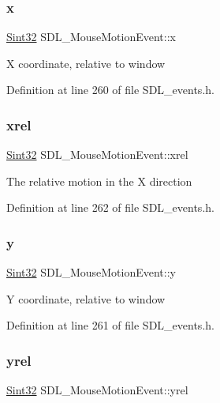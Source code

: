\subsubsection{\texorpdfstring{x}{x}}
{\footnotesize\ttfamily \mbox{\hyperlink{_s_d_l__stdinc_8h_a7a90b941db9d4582e9ad7abb9940ff7e}{Sint32}} S\+D\+L\+\_\+\+Mouse\+Motion\+Event\+::x}

X coordinate, relative to window 

Definition at line 260 of file S\+D\+L\+\_\+events.\+h.

\mbox{\label{struct_s_d_l___mouse_motion_event_a1c01d9aba2a20778fb45a15dca39ef58}} 
\subsubsection{\texorpdfstring{xrel}{xrel}}
{\footnotesize\ttfamily \mbox{\hyperlink{_s_d_l__stdinc_8h_a7a90b941db9d4582e9ad7abb9940ff7e}{Sint32}} S\+D\+L\+\_\+\+Mouse\+Motion\+Event\+::xrel}

The relative motion in the X direction 

Definition at line 262 of file S\+D\+L\+\_\+events.\+h.

\mbox{\label{struct_s_d_l___mouse_motion_event_a7e6a7b1f8713d1968dc913908e8ea448}} 
\subsubsection{\texorpdfstring{y}{y}}
{\footnotesize\ttfamily \mbox{\hyperlink{_s_d_l__stdinc_8h_a7a90b941db9d4582e9ad7abb9940ff7e}{Sint32}} S\+D\+L\+\_\+\+Mouse\+Motion\+Event\+::y}

Y coordinate, relative to window 

Definition at line 261 of file S\+D\+L\+\_\+events.\+h.

\mbox{\label{struct_s_d_l___mouse_motion_event_a7674c8b92d039ab948f671a180fa7b30}} 
\subsubsection{\texorpdfstring{yrel}{yrel}}
{\footnotesize\ttfamily \mbox{\hyperlink{_s_d_l__stdinc_8h_a7a90b941db9d4582e9ad7abb9940ff7e}{Sint32}} S\+D\+L\+\_\+\+Mouse\+Motion\+Event\+::yrel}

